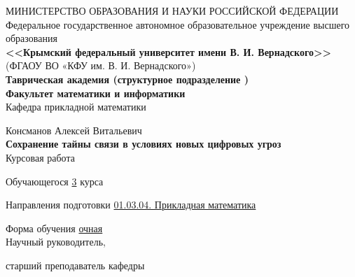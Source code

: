     \begin{titlepage}
    \newpage
	\pagestyle{empty} %
    \begin{center}
    
	
	{\fontsize{13}{15.6}\selectfont МИНИСТЕРСТВО ОБРАЗОВАНИЯ И НАУКИ РОССИЙСКОЙ ФЕДЕРАЦИИ}\\ 
    \normalsize  {Федеральное государственное автономное образовательное учреждение высшего образования} \\
    
    \large \textbf{<<Крымский  федеральный  университет имени В. И. Вернадского>>} \\  \vspace{2mm}
    (ФГАОУ ВО «КФУ им. В. И. Вернадского»)\\
    
    \textbf{Таврическая академия (структурное подразделение ) \\
    \vspace{2mm}
    Факультет математики и информатики} \\
    \vspace{2mm}
    Кафедра прикладной математики 
    \end{center}
    \vspace{1em}

    \begin{center}
	\normalsize Консманов Алексей Витальевич \\
    \LARGE \textbf{Сохранение тайны связи в условиях новых цифровых угроз} \\
    \vspace{1em}
    \normalsize Курсовая работа 
    \end{center}

    \vspace{1em}
    Обучающегося \hspace*{3cm} \underline{3} курса 
    
    
    Направления подготовки\hspace*{8mm} \underline{01.03.04. Прикладная математика}
    
        
    Форма обучения\hspace*{2.75cm} \underline{очная}\\
    
    
    Научный руководитель,
    
    старший преподаватель кафедры 
    

\end{titlepage}
